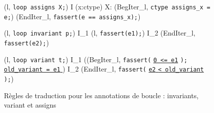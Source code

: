 \begin{figure*}[bt]
  \scriptsize{
    {
      {
        \splitfrac
            {
              (l, \mbox{\lstinline'loop assigns X;'}) 
            }
            {
              I \concat
              \forall (x:ctype) \not \in X:
              (BegIter_l, \mbox{\lstinline'ctype assigns_x = e;'})
              \concat (EndIter_l, \mbox{\lstinline'fassert(e == assigns_x);'})
            }
      }
    }

    {
      {
        (l, \mbox{\lstinline'loop invariant p;'}) 
        I_1 \concat (l, \mbox{\lstinline'fassert(e1);'})
        \concat I_2 \concat (EndIter_l, \mbox{\lstinline'fassert(e2);'})
      }
    }

    {
      {
        \splitfrac
            {
              (l, \mbox{\lstinline'loop variant t;'}) 
            }
            {
              I_1 \concat ((BegIter_l,
              \mbox{\lstinline'fassert('}
              \underline{\mbox{\lstinline'0 <= e1'}}
              \mbox{\lstinline');' }
              \underline{\Zinit \mbox{\lstinline'old_variant = e1'} \Zclear}
              \semicolon)
              \concat I_2
              \concat(EndIter_l,
              \mbox{\lstinline'fassert('}
              \underline{\mbox{\lstinline'e2'}\Zclear
                \mbox{\lstinline'< old_variant'} \Zclear}
              \mbox{\lstinline');'})
            }
      }
    }
  }
  \caption{Règles de traduction pour les annotations de boucle : invariants,
    variant et assigns}
  \label{fig:loop-annot}
\end{figure*}


